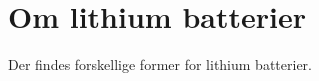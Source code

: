 \section{Om lithium batterier}\label{sec:om_lithium}

Der findes forskellige former for lithium batterier. 